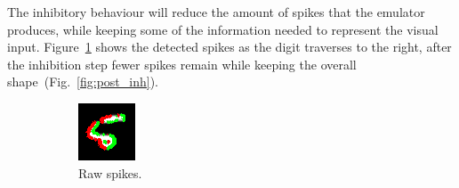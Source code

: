 \documentclass[twocolumn, a4paper]{article}
\begin{document}


The inhibitory behaviour will reduce the amount of spikes that the emulator produces, while keeping some of the information needed to represent the visual input. Figure~\ref{fig:pre_inh} shows the detected spikes as the digit traverses to the right, after the inhibition step fewer spikes remain while keeping the overall shape~(Fig.~\ref{fig:post_inh}).

\begin{figure}[htb]
  \captionsetup[subfigure]{justification=centering}
  \centering
  \begin{subfigure}[b]{0.2\textwidth}
    \includegraphics[width=\textwidth]{pre_inh_frame_262}
    \caption{Raw spikes.}
    \label{fig:pre_inh}
  \end{subfigure}
  ~
  \begin{subfigure}[b]{0.2\textwidth}

\end{subfigure}
\end{figure}
\end{document}

